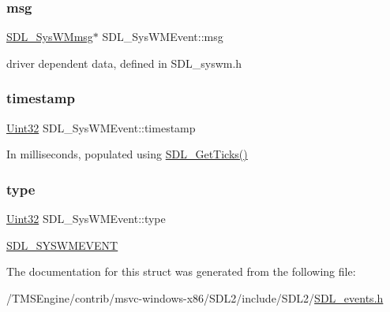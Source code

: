 \subsubsection{\texorpdfstring{msg}{msg}}
{\footnotesize\ttfamily \hyperlink{struct_s_d_l___sys_w_mmsg}{S\+D\+L\+\_\+\+Sys\+W\+Mmsg}$\ast$ S\+D\+L\+\_\+\+Sys\+W\+M\+Event\+::msg}

driver dependent data, defined in S\+D\+L\+\_\+syswm.\+h \mbox{\label{struct_s_d_l___sys_w_m_event_a5d3cb97006d99b620c2671c27bd82c06}} 
\subsubsection{\texorpdfstring{timestamp}{timestamp}}
{\footnotesize\ttfamily \hyperlink{_s_d_l__stdinc_8h_add440eff171ea5f55cb00c4a9ab8672d}{Uint32} S\+D\+L\+\_\+\+Sys\+W\+M\+Event\+::timestamp}

In milliseconds, populated using \hyperlink{_s_d_l__timer_8h_a0b9bc71d6287e0ffafdc3419760fe2b3}{S\+D\+L\+\_\+\+Get\+Ticks()} \mbox{\label{struct_s_d_l___sys_w_m_event_a84697e96cb16bf6a570e10b5bfdcd392}} 
\subsubsection{\texorpdfstring{type}{type}}
{\footnotesize\ttfamily \hyperlink{_s_d_l__stdinc_8h_add440eff171ea5f55cb00c4a9ab8672d}{Uint32} S\+D\+L\+\_\+\+Sys\+W\+M\+Event\+::type}

\hyperlink{_s_d_l__events_8h_a3b589e89be6b35c02e0dd34a55f3fccaa73749d735a18ce6ef17a09ee70d5dbe7}{S\+D\+L\+\_\+\+S\+Y\+S\+W\+M\+E\+V\+E\+NT} 

The documentation for this struct was generated from the following file\+:\begin{DoxyCompactItemize}
\item 
/\+T\+M\+S\+Engine/contrib/msvc-\/windows-\/x86/\+S\+D\+L2/include/\+S\+D\+L2/\hyperlink{_s_d_l__events_8h}{S\+D\+L\+\_\+events.\+h}\end{DoxyCompactItemize}
